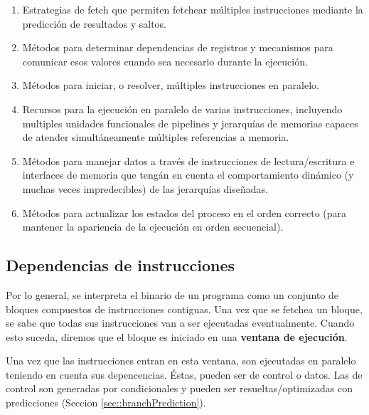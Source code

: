 \begin{enumerate}
	\item Estrategias de fetch que permiten fetchear múltiples instrucciones mediante la predicción de resultados y saltos.
	\item Métodos para determinar dependencias de registros y mecanismos para comunicar esos valores cuando sea necesario durante la ejecución.
	\item Métodos para iniciar, o resolver, múltiples instrucciones en paralelo.
	\item Recursos para la ejecución en paralelo de varias instrucciones, incluyendo multiples unidades funcionales de pipelines y jerarquías de memorias capaces de atender simultáneamente múltiples referencias a memoria.
	\item Métodos para manejar datos a través de instrucciones de lectura/escritura e interfaces de memoria que tengán en cuenta el comportamiento dinámico (y muchas veces impredecibles) de las jerarquías diseñadas.
	\item Métodos para actualizar los estados del proceso en el orden correcto (para mantener la apariencia de la ejecución en orden secuencial).
\end{enumerate}

\subsection{Dependencias de instrucciones}\label{sec:instructionLevelParalelism:dependenciaDeInstrucciones}
Por lo general, se interpreta el binario de un programa como un conjunto de bloques compuestos de instrucciones contiguas. Una vez que se fetchea un bloque, se sabe que todas sus instrucciones van a ser ejecutadas eventualmente. Cuando esto suceda, diremos que el bloque es iniciado en una \textbf{ventana de ejecución}.

Una vez que las instrucciones entran en esta ventana, son ejecutadas en paralelo teniendo en cuenta sus depencencias. Éstas, pueden ser de control o datos. Las de control son generadas por condicionales y pueden ser resueltas/optimizadas con predicciones (Seccion \ref{sec::branchPrediction}). 

